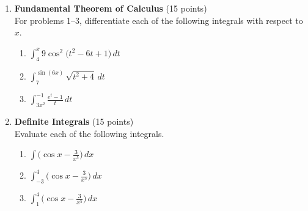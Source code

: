 \begin{enumerate}
  \item \textbf{Fundamental Theorem of Calculus} (15 points)\\
  For problems 1--3, differentiate each of the following integrals with respect to $x$.
  \begin{enumerate}
    \item $\displaystyle \int_4^x 9 \cos^2\bigl(t^2 - 6 t + 1\bigr) \,dt$
    \item $\displaystyle \int_7^{\sin(6 x)} \sqrt{t^2 + 4} \,dt$
    \item $\displaystyle \int_{3 x^2}^{-1} \frac{e^t - 1}{t} \,dt$
  \end{enumerate}
  \begin{subanswer}
  \end{subanswer}
  \item \textbf{Definite Integrals} (15 points)\\
  Evaluate each of the following integrals.
  \begin{enumerate}[label=(\alph*)]
    \item $\displaystyle \int \biggl(\cos x - \frac{3}{x^5}\biggr) \,dx$
    \item $\displaystyle \int_{-3}^4 \biggl(\cos x - \frac{3}{x^5}\biggr) \,dx$
    \item $\displaystyle \int_1^4 \biggl(\cos x - \frac{3}{x^5}\biggr) \,dx$
  \end{enumerate}
  \begin{subanswer}
  \end{subanswer}




\end{enumerate}
